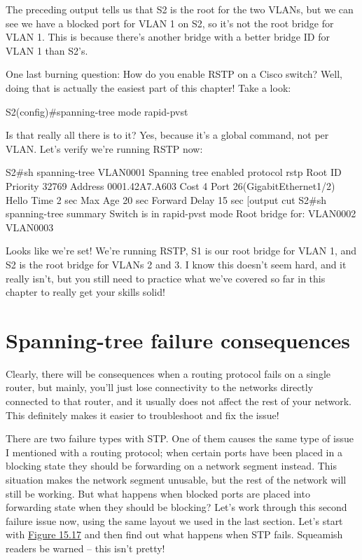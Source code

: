 The preceding output tells us that S2 is the root for the two VLANs, but
we can see we have a blocked port for VLAN 1 on S2, so it's not the root
bridge for VLAN 1. This is because there's another bridge with a better
bridge ID for VLAN 1 than S2's.

One last burning question: How do you enable RSTP on a Cisco switch?
Well, doing that is actually the easiest part of this chapter! Take a
look:

\begin{cli}
S2(config)#spanning-tree mode rapid-pvst
\end{cli}

Is that really all there is to it? Yes, because it's a global command,
not per VLAN. Let's verify we're running RSTP now:

\begin{cli}
S2#sh spanning-tree
VLAN0001
  Spanning tree enabled protocol rstp
  Root ID    Priority    32769
             Address     0001.42A7.A603
             Cost        4
             Port        26(GigabitEthernet1/2)
             Hello Time  2 sec  Max Age 20 sec  Forward Delay 15 sec
[output cut
S2#sh spanning-tree summary
Switch is in rapid-pvst mode
Root bridge for: VLAN0002 VLAN0003
\end{cli}

Looks like we're set! We're running RSTP, S1 is our root bridge for VLAN
1, and S2 is the root bridge for VLANs 2 and 3. I know this doesn't seem
hard, and it really isn't, but you still need to practice what we've
covered so far in this chapter to really get your skills solid!

\section{Spanning-tree failure consequences}

Clearly, there will be consequences when a routing protocol fails on a
single router, but mainly, you'll just lose connectivity to the networks
directly connected to that router, and it usually does not affect the
rest of your network. This definitely makes it easier to troubleshoot
and fix the issue!

There are two failure types with STP. One of them causes the same type
of issue I mentioned with a routing protocol; when certain ports have
been placed in a blocking state they should be forwarding on a network
segment instead. This situation makes the network
segment unusable, but
the rest of the network will still be working. But what happens when
blocked ports are placed into forwarding state when they should be
blocking? Let's work through this second failure issue now, using the
same layout we used in the last section. Let's start with
\protect\hyperlink{c15.xhtmlux5cux23figure15-17}{Figure 15.17} and then
find out what happens when STP fails. Squeamish readers be warned -- this
isn't pretty!

